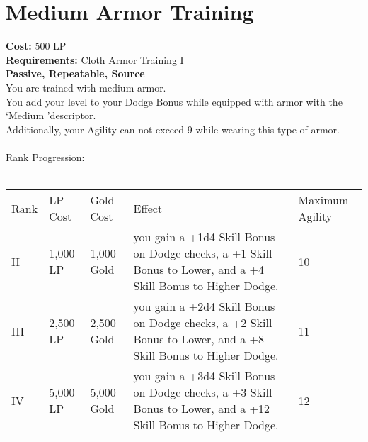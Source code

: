 \section{Medium Armor Training}\label{perk:mediumArmorTraining}
\textbf{Cost:} 500 LP\\
\textbf{Requirements:} Cloth Armor Training I\\
\textbf{Passive, Repeatable, Source}\\
You are trained with medium armor.\\
You add your level to your Dodge Bonus while equipped with armor with the \lq Medium \rq descriptor.\\
Additionally, your Agility can not exceed 9 while wearing this type of armor.\\
\\
Rank Progression:\\
\\
\begin{longtable}{l | l | l | l | p{9cm}}
	Rank & LP Cost & Gold Cost & Effect & Maximum Agility
	\\
	II
	& 1,000 LP
	& 1,000 Gold
	& you gain a +1d4 Skill Bonus on Dodge checks, a +1 Skill Bonus to Lower, and a +4 Skill Bonus to Higher Dodge.
	& 10
	\\
	III
	& 2,500 LP
	& 2,500 Gold
	& you gain a +2d4 Skill Bonus on Dodge checks, a +2 Skill Bonus to Lower, and a +8 Skill Bonus to Higher Dodge.
	& 11
	\\
	IV
	& 5,000 LP
	& 5,000 Gold
	& you gain a +3d4 Skill Bonus on Dodge checks, a +3 Skill Bonus to Lower, and a +12 Skill Bonus to Higher Dodge.
	& 12
	\\
\end{longtable}